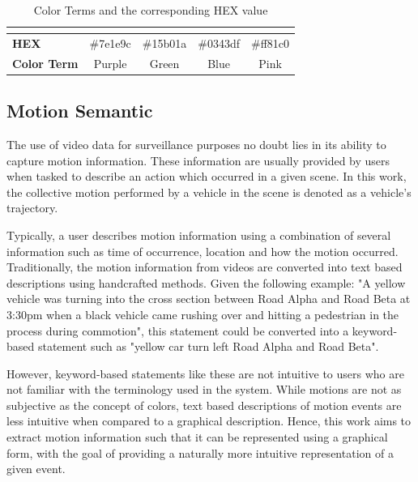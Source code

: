 \begin{table}[]
\begin{tabular}{lcccc}
\multicolumn{1}{l|}{}                     & \multicolumn{1}{l|}{\cellcolor[HTML]{7E1E9C}} & \multicolumn{1}{l|}{\cellcolor[HTML]{15B01A}} & \multicolumn{1}{l|}{\cellcolor[HTML]{0343DF}} & \multicolumn{1}{l|}{\cellcolor[HTML]{FF81C0}} \\ \hline
\multicolumn{1}{|l|}{\textbf{HEX}}        & \multicolumn{1}{c|}{\#7e1e9c}                 & \multicolumn{1}{c|}{\#15b01a}                 & \multicolumn{1}{c|}{\#0343df}                 & \multicolumn{1}{c|}{\#ff81c0}                 \\ \hline
\multicolumn{1}{|l|}{\textbf{Color Term}}  & \multicolumn{1}{c|}{Purple}                   & \multicolumn{1}{c|}{Green}                    & \multicolumn{1}{c|}{Blue}                     & \multicolumn{1}{c|}{Pink}                     \\ \hline
\end{tabular}
\caption{Color Terms and the corresponding HEX value}
\label{table:colorshex}
\end{table}



\subsection{Motion Semantic}

The use of video data for surveillance purposes no doubt lies in its ability to capture motion information. These information are usually provided by users when tasked to describe an action which occurred in a given scene. In this work, the collective motion performed by a vehicle in the scene is denoted as a vehicle's trajectory.  

Typically, a user describes motion information using a combination of several information such as time of occurrence, location and how the motion occurred. Traditionally, the motion information from videos are converted into text based descriptions using handcrafted methods. Given the following example: "A yellow vehicle was turning into the cross section between Road Alpha and Road Beta at 3:30pm when a black vehicle came rushing over and hitting a pedestrian in the process during commotion", this statement could be converted into a keyword-based statement such as "yellow car turn left Road Alpha and Road Beta". 

However, keyword-based statements like these are not intuitive to users who are not familiar with the terminology used in the system. While motions are not as subjective as the concept of colors, text based descriptions of motion events are less intuitive when compared to a graphical description. Hence, this work aims to extract motion information such that it can be represented using a graphical form, with the goal of providing a naturally more intuitive representation of a given event.



